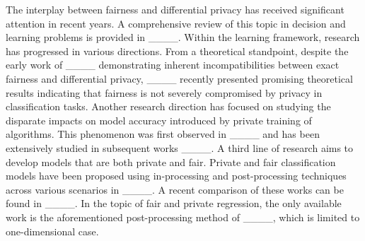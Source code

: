 The interplay between fairness and differential privacy has received significant attention in recent years. A comprehensive review of this topic in decision and learning problems is provided in ____. Within the learning framework, research has progressed in various directions. From a theoretical standpoint, despite the early work of ____ demonstrating inherent incompatibilities between exact fairness and differential privacy, ____ recently presented promising theoretical results indicating that fairness is not severely compromised by privacy in classification tasks. Another research direction has focused on studying the disparate impacts on model accuracy introduced by private training of algorithms. This phenomenon was first observed in ____ and has been extensively studied in subsequent works ____. A third line of research aims to develop models that are both private and fair. Private and fair classification models have been proposed using in-processing and post-processing techniques across various scenarios in ____. A recent comparison of these works can be found in ____. 
In the topic of fair and private regression, the only available work is the aforementioned post-processing method of ____, which is limited to one-dimensional case.